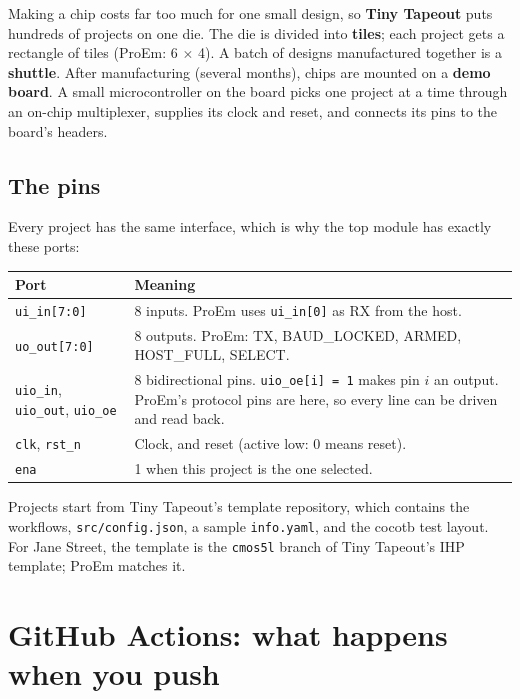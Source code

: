 \documentclass[11pt,a4paper]{article}
\newcommand{\file}[1]{\texttt{#1}}
\begin{document}
Making a chip costs far too much for one small design, so \textbf{Tiny Tapeout} puts hundreds of projects on one die. The die is divided into \textbf{tiles}; each project gets a rectangle of tiles (ProEm: 6 $\times$ 4). A batch of designs manufactured together is a \textbf{shuttle}. After manufacturing (several months), chips are mounted on a \textbf{demo board}. A small microcontroller on the board picks one project at a time through an on-chip multiplexer, supplies its clock and reset, and connects its pins to the board's headers.

\subsection{The pins}

Every project has the same interface, which is why the top module has exactly these ports:

\begin{center}
\begin{tabularx}{\linewidth}{@{}lL@{}}
\toprule
Port & Meaning \\
\midrule
\texttt{ui\_in[7:0]} & 8 inputs. ProEm uses \texttt{ui\_in[0]} as RX from the host. \\
\texttt{uo\_out[7:0]} & 8 outputs. ProEm: TX, BAUD\_LOCKED, ARMED, HOST\_FULL, SELECT. \\
\texttt{uio\_in}, \texttt{uio\_out}, \texttt{uio\_oe} & 8 bidirectional pins. \texttt{uio\_oe[i] = 1} makes pin $i$ an output. ProEm's protocol pins are here, so every line can be driven and read back. \\
\texttt{clk}, \texttt{rst\_n} & Clock, and reset (active low: 0 means reset). \\
\texttt{ena} & 1 when this project is the one selected. \\
\bottomrule
\end{tabularx}
\end{center}

Projects start from Tiny Tapeout's template repository, which contains the workflows, \file{src/config.json}, a sample \file{info.yaml}, and the cocotb test layout. For Jane Street, the template is the \texttt{cmos5l} branch of Tiny Tapeout's IHP template; ProEm matches it.

\section{GitHub Actions: what happens when you push}\label{sec:actions}
\end{document}
